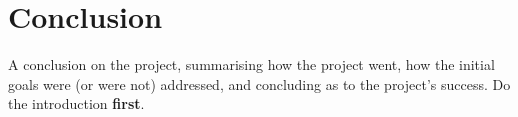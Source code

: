 \chapter{Conclusion} %
\label{cha:conclusion}
A conclusion on the project, summarising how the project went, how the initial goals were (or were not) addressed, and concluding as to the project's success. 
Do the introduction \textbf{first}. 


